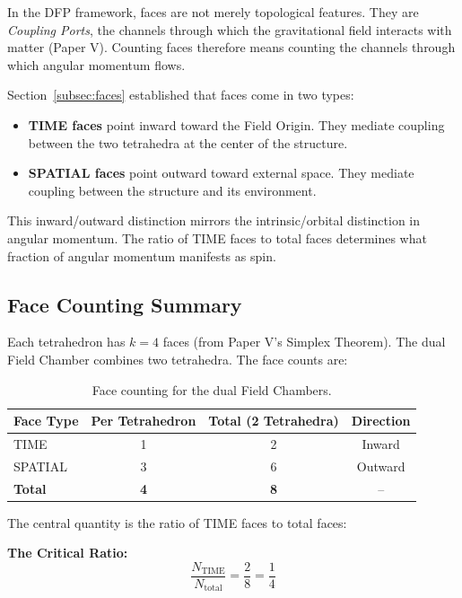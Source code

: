 \documentclass[aps,prd,preprint,superscriptaddress,showpacs,preprintnumbers,amsmath,amssymb,nofootinbib]{revtex4-2}
\begin{document}
In the DFP framework, faces are not merely topological features. They are \emph{Coupling Ports}, the channels through which the gravitational field interacts with matter (Paper V). Counting faces therefore means counting the channels through which angular momentum flows.

Section~\ref{subsec:faces} established that faces come in two types:
\begin{itemize}
\item \textbf{TIME faces} point inward toward the Field Origin. They mediate coupling between the two tetrahedra at the center of the structure.
\item \textbf{SPATIAL faces} point outward toward external space. They mediate coupling between the structure and its environment.
\end{itemize}

This inward/outward distinction mirrors the intrinsic/orbital distinction in angular momentum. The ratio of TIME faces to total faces determines what fraction of angular momentum manifests as spin.

\subsection{Face Counting Summary}
\label{subsec:face-counting}

Each tetrahedron has $k=4$ faces (from Paper V's Simplex Theorem). The dual Field Chamber combines two tetrahedra. The face counts are:

\begin{table}[H]
\centering
\begin{tabular*}{\textwidth}{@{\extracolsep{\fill}} lccc @{}}
\toprule
\textbf{Face Type} & \textbf{Per Tetrahedron} & \textbf{Total (2 Tetrahedra)} & \textbf{Direction} \\
\midrule
TIME & 1 & 2 & Inward \\
SPATIAL & 3 & 6 & Outward \\
\textbf{Total} & \textbf{4} & \textbf{8} & -- \\
\bottomrule
\end{tabular*}
\caption{Face counting for the dual Field Chambers.}
\label{tab:face-counting}
\end{table}

The central quantity is the ratio of TIME faces to total faces:

\textbf{The Critical Ratio:}
\begin{equation}
\frac{N_{\text{TIME}}}{N_{\text{total}}} = \frac{2}{8} = \frac{1}{4}
\end{equation}
\end{document}
